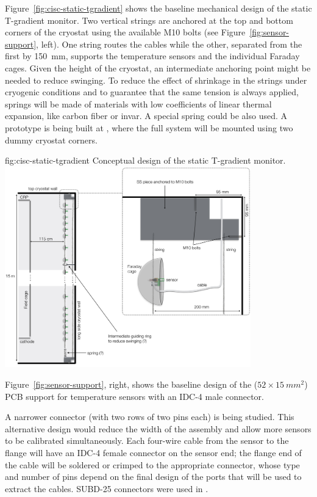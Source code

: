 Figure~\ref{fig:cisc-static-tgradient} shows the baseline mechanical design of
the static T-gradient monitor. Two vertical strings are anchored at the top and bottom corners of the cryostat
using the available M10 bolts (see Figure~\ref{fig:sensor-support}, left). One string routes the cables while the other,
separated from the first by \SI{150}{mm},  supports the temperature sensors and the individual Faraday cages. 
Given the height of the cryostat, an intermediate anchoring point might be needed to reduce swinging. To reduce the effect of shrinkage in the strings under cryogenic conditions and to guarantee that the same tension is always applied, springs will be made of materials with low coefficients of linear thermal expansion, like carbon fiber or invar. A special spring could be also used. A prototype is being built at , where the full system will be mounted using two dummy cryostat corners.  
\begin{dunefigure}
{fig:cisc-static-tgradient}
  {Conceptual design of the static T-gradient monitor.}
  \includegraphics[width=0.8\textwidth]{graphics/cisc_dp_static_tgradient.png}
\end{dunefigure}


Figure~\ref{fig:sensor-support}, right, shows the baseline design of the ($52\times \SI{15}{mm^2}$) 
PCB support for temperature sensors with an IDC-4 male connector. %

A narrower connector (with two rows of two pins each) is being studied. This alternative design would reduce the width of the  assembly and allow more sensors to be calibrated simultaneously. Each four-wire cable from the sensor to the flange will have an IDC-4 female connector on the sensor end; the flange end of the cable will be soldered or crimped to the appropriate connector, whose type and number of pins  depend on the final design of the  ports that will be used to extract the cables. SUBD-25 connectors were used in .



